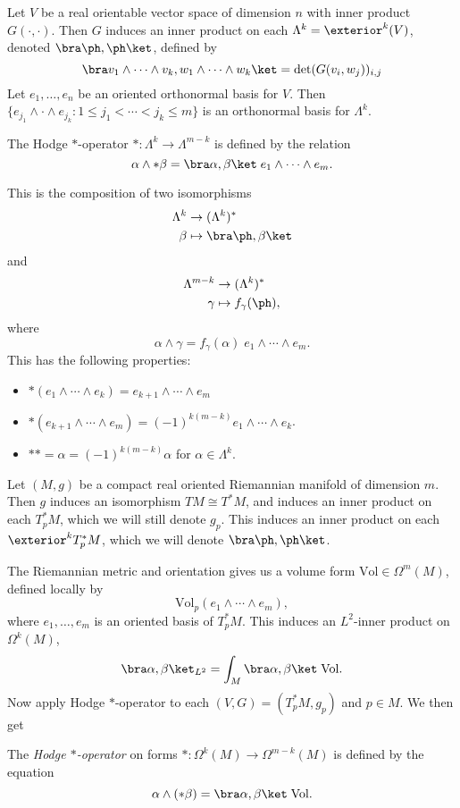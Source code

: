 \documentclass[a4paper]{article}
\newcommand\Vol{\mathrm{Vol}}
\begin{document}
Let $V$ be a real orientable vector space of dimension $n$ with inner product $G(\cdot, \cdot)$. Then $G$ induces an inner product on each $\Lambda^k = \exterior^k (V)$, denoted $\bra \ph, \ph\ket$, defined by
\[
  \bra v_1 \wedge \cdots \wedge v_k, w_1 \wedge \cdots \wedge w_k\ket = \det (G(v_i, w_j))_{i, j}
\]
Let $e_1, \ldots, e_n$ be an oriented orthonormal basis for $V$. Then $\{e_{j_1} \wedge \cdot \wedge e_{j_k} : 1 \leq j_1 < \cdots < j_k \leq m\}$ is an orthonormal basis for $\Lambda^k$.
\begin{defi}
  The Hodge $*$-operator \index{$*$}$*: \Lambda^k \to \Lambda^{m - k}$ is defined by the relation
  \[
    \alpha \wedge *\beta = \bra \alpha, \beta\ket\; e_1 \wedge \cdots \wedge e_m.
  \]
\end{defi}
This is the composition of two isomorphisms
\begin{align*}
  \Lambda^k & \to (\Lambda^k)^*\\
  \beta &\mapsto \bra \ph, \beta \ket
\end{align*}
and
\begin{align*}
  \Lambda^{m - k} &\to (\Lambda^k)^*\\
  \gamma &\mapsto f_\gamma(\ph),
\end{align*}
where
\[
  \alpha \wedge \gamma = f_\gamma(\alpha) \; e_1 \wedge \cdots \wedge e_m.
\]
This has the following properties:
\begin{prop}\leavevmode
  \begin{itemize}
    \item $*(e_1 \wedge \cdots \wedge e_k) = e_{k + 1} \wedge \cdots \wedge e_m$
    \item $*(e_{k + 1} \wedge \cdots \wedge e_m) = (-1)^{k(m - k)} e_1 \wedge \cdots \wedge e_k$.
    \item $** =\alpha = (-1)^{k(m - k)}\alpha$ for $\alpha \in \Lambda^k$.\fakeqed
  \end{itemize}
\end{prop}
Let $(M, g)$ be a compact real oriented Riemannian manifold of dimension $m$. Then $g$ induces an isomorphism $TM \cong T^*M$, and induces an inner product on each $T_p^* M$, which we will still denote $g_p$. This induces an inner product on each $\exterior^k T_p^*M$, which we will denote $\bra \ph, \ph \ket$.


The Riemannian metric and orientation gives us a volume form $\Vol \in \Omega^m(M)$, defined locally by
\[
  \Vol_p(e_1 \wedge \cdots \wedge e_m),
\]
where $e_1, \ldots, e_m$ is an oriented basis of $T_p^*M$. This induces an $L^2$-inner product on $\Omega^k(M)$,
\[
  \bra \alpha, \beta\ket_{L^2} = \int_M \bra \alpha, \beta\ket\;\Vol.
\]
Now apply Hodge $*$-operator to each $(V, G) = (T_p^* M, g_p)$ and $p \in M$. We then get
\begin{defi}\index{$*$}
  The \emph{Hodge $*$-operator} on forms $*: \Omega^k(M) \to \Omega^{m - k}(M)$ is defined by the equation
  \[
    \alpha \wedge (*\beta) = \bra \alpha ,\beta\ket \; \Vol.
  \]
\end{defi}
\end{document}

